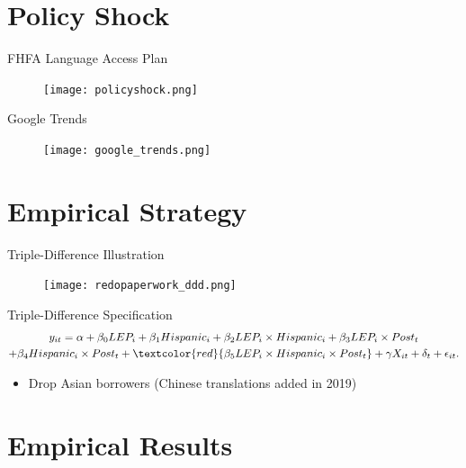 \documentclass[aspectratio=169,11pt]{beamer}
\begin{document}
\section{Policy Shock}
\begin{frame}
\sectionpage
\end{frame}

\begin{frame}{FHFA Language Access Plan}
\begin{figure}
\centering
\texttt{[image: policyshock.png]}
\end{figure}       
\end{frame}

\begin{frame}{Google Trends}
\begin{figure}
\centering
\texttt{[image: google\_trends.png]}
\end{figure}       
\end{frame}

\section{Empirical Strategy}
\begin{frame}
\sectionpage
\end{frame}

\begin{frame}{Triple-Difference Illustration}
\begin{figure}
\centering
\texttt{[image: redopaperwork\_ddd.png]}
\end{figure}          
\end{frame}

\begin{frame}{Triple-Difference Specification}
\begin{multline} \label{eq:ddd}
    y_{it} = \alpha + \beta_0 LEP_i + \beta_1 Hispanic_i + \beta_2 LEP_i \times Hispanic_i + \beta_3 LEP_i \times Post_t \\+ \beta_4 Hispanic_i \times Post_t + \textcolor{red}{\beta_5 LEP_i \times Hispanic_i \times Post_t} + \gamma X_{it} + \delta_t + \epsilon_{it}.    
\end{multline}    
\begin{itemize}
    \item Drop Asian borrowers (Chinese translations added in 2019)
\end{itemize}
\end{frame}

\section{Empirical Results}
\begin{frame}
\sectionpage
\end{frame}
\end{document}
